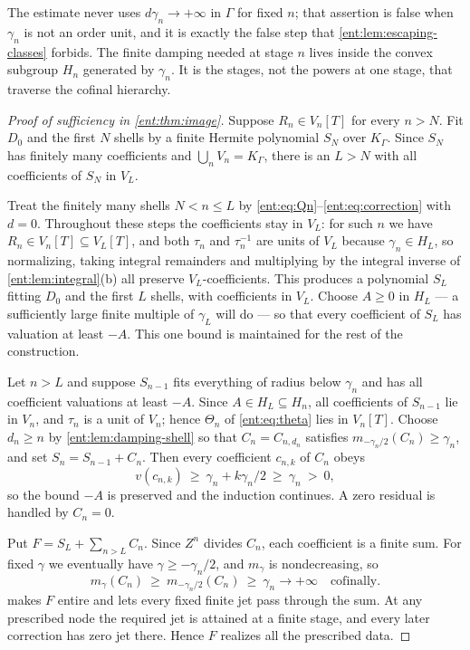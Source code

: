 \documentclass[11pt]{article}
\theoremstyle{plain}
\theoremstyle{plain}
\theoremstyle{plain}
\theoremstyle{definition}
\theoremstyle{definition}
\theoremstyle{definition}
\theoremstyle{definition}
\theoremstyle{remark}
\newcommand{\K}{K_\Gamma}\newcommand{\KD}{K_\Delta}
\begin{document}
The estimate never uses $d\gamma_n\to+\infty$ in $\Gamma$ for fixed $n$; that
assertion is false when $\gamma_n$ is not an order unit, and it is exactly
the false step that \cref{ent:lem:escaping-classes} forbids. The finite
damping needed at stage $n$ lives inside the convex subgroup $H_n$ generated
by $\gamma_n$. It is the stages, not the powers at one stage, that traverse
the cofinal hierarchy.

\begin{proof}[Proof of sufficiency in \cref{ent:thm:image}]
Suppose $R_n\in V_n[T]$ for every $n>N$. Fit $D_0$ and the first $N$ shells by
a finite Hermite polynomial $S_N$ over $\K$. Since $S_N$ has finitely many
coefficients and $\bigcup_nV_n=\K$, there is an $L>N$ with all coefficients of
$S_N$ in $V_L$.

Treat the finitely many shells $N<n\le L$ by
\eqref{ent:eq:Qn}--\eqref{ent:eq:correction} with $d=0$. Throughout these
steps the coefficients stay in $V_L$: for such $n$ we have
$R_n\in V_n[T]\subseteq V_L[T]$, and both $\tau_n$ and $\tau_n^{-1}$ are units
of $V_L$ because $\gamma_n\in H_L$, so normalizing, taking integral
remainders and multiplying by the integral inverse of
\cref{ent:lem:integral}(b) all preserve $V_L$-coefficients. This produces a
polynomial $S_L$ fitting $D_0$ and the first $L$ shells, with coefficients in
$V_L$. Choose $A\ge0$ in $H_L$ --- a sufficiently large finite multiple of
$\gamma_L$ will do --- so that every coefficient of $S_L$ has valuation at
least $-A$. This one bound is maintained for the rest of the construction.

Let $n>L$ and suppose $S_{n-1}$ fits everything of radius below $\gamma_n$
and has all coefficient valuations at least $-A$. Since $A\in H_L\subseteq
H_n$, all coefficients of $S_{n-1}$ lie in $V_n$, and $\tau_n$ is a unit of
$V_n$; hence $\Theta_n$ of \eqref{ent:eq:theta} lies in $V_n[T]$. Choose
$d_n\ge n$ by \cref{ent:lem:damping-shell} so that $C_n=C_{n,d_n}$ satisfies
$m_{-\gamma_n/2}(C_n)\ge\gamma_n$, and set $S_n=S_{n-1}+C_n$. Then every
coefficient $c_{n,k}$ of $C_n$ obeys
\begin{equation}\label{ent:eq:strongcoefbound}
 v(c_{n,k})\ \ge\ \gamma_n+k\gamma_n/2\ \ge\ \gamma_n\ >\ 0,
\end{equation}
so the bound $-A$ is preserved and the induction continues. A zero residual
is handled by $C_n=0$.

Put $F=S_L+\sum_{n>L}C_n$. Since $Z^n$ divides $C_n$, each coefficient is a
finite sum. For fixed $\gamma$ we eventually have $\gamma\ge-\gamma_n/2$, and
$m_\gamma$ is nondecreasing, so
\[
 m_\gamma(C_n)\ \ge\ m_{-\gamma_n/2}(C_n)\ \ge\ \gamma_n
 \longrightarrow+\infty\quad\text{cofinally}.
\]
 makes $F$ entire and lets every fixed finite jet pass
through the sum. At any prescribed node the required jet is attained at a
finite stage, and every later correction has zero jet there. Hence $F$
realizes all the prescribed data.
\end{proof}
\end{document}
